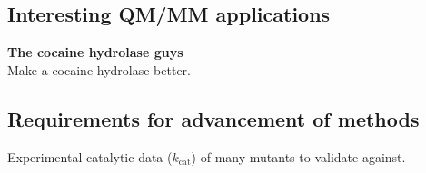 \subsection{Interesting QM/MM applications}
\textbf{The cocaine hydrolase guys}\\
Make a cocaine hydrolase better\cite{gao2006computational}.

\subsection{Requirements for advancement of methods}
Experimental catalytic data ($k_\text{cat}$) of many mutants to validate against.

